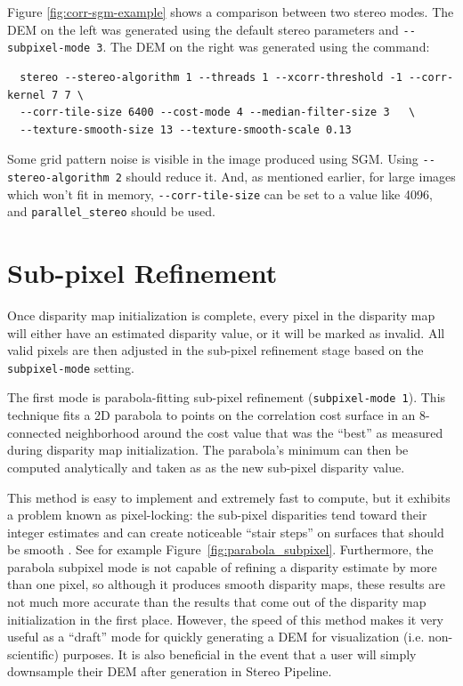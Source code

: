 Figure \ref{fig:corr-sgm-example} shows a comparison between two stereo modes. The DEM on the left was generated using the default stereo parameters and 
  \texttt{-{}-subpixel-mode 3}.  The DEM on the right was generated using the command: 

\begin{verbatim}
  stereo --stereo-algorithm 1 --threads 1 --xcorr-threshold -1 --corr-kernel 7 7 \
  --corr-tile-size 6400 --cost-mode 4 --median-filter-size 3   \
  --texture-smooth-size 13 --texture-smooth-scale 0.13
\end{verbatim}

Some grid pattern noise is visible in the image produced using
SGM. Using \texttt{-\/-stereo-algorithm 2} should reduce it. And, as
mentioned earlier, for large images which won't fit in memory,
\texttt{-\/-corr-tile-size} can be set to a value like 4096, and
\texttt{parallel\_stereo} should be used.

\section{Sub-pixel Refinement}
\label{sec:subpixel}

Once disparity map initialization is complete, every pixel in the
disparity map will either have an estimated disparity value, or it
will be marked as invalid.  All valid pixels are then adjusted in the
sub-pixel refinement stage based on the \texttt{subpixel-mode}
setting.

The first mode is parabola-fitting sub-pixel refinement
(\texttt{subpixel-mode 1}).  This technique fits a 2D parabola to
points on the correlation cost surface in an 8-connected neighborhood
around the cost value that was the ``best'' as measured during
disparity map initialization. The parabola's minimum can then be
computed analytically and taken as as the new sub-pixel disparity
value.

This method is easy to implement and extremely fast to compute, but it
exhibits a problem known as pixel-locking: the sub-pixel disparities
tend toward their integer estimates and can create noticeable ``stair
steps'' on surfaces that should be smooth
\citep{Stein06:attenuating,Szeliski03sampling}.  See
for example Figure~\ref{fig:parabola_subpixel}. Furthermore, the parabola
subpixel mode is not capable of refining a disparity estimate by more
than one pixel, so although it produces smooth disparity maps, these
results are not much more accurate than the results that come out of
the disparity map initialization in the first place.  However, the
speed of this method makes it very useful as a ``draft'' mode for
quickly generating a \ac{DEM} for visualization (i.e. non-scientific)
purposes. It is also beneficial in the event that a user will simply
downsample their DEM after generation in Stereo Pipeline.

